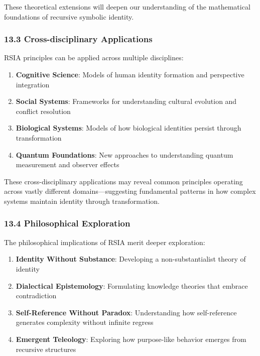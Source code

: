 \documentclass[12pt]{article}
\providecommand{\tightlist}{%
  \setlength{\itemsep}{0pt}\setlength{\parskip}{0pt}}
\begin{document}
These theoretical extensions will deepen our understanding of the
mathematical foundations of recursive symbolic identity.

\subsubsection{13.3 Cross-disciplinary
Applications}\label{cross-disciplinary-applications}

RSIA principles can be applied across multiple disciplines:

\begin{enumerate}
\def\labelenumi{\arabic{enumi}.}
\tightlist
\item
  \textbf{Cognitive Science}: Models of human identity formation and
  perspective integration
\item
  \textbf{Social Systems}: Frameworks for understanding cultural
  evolution and conflict resolution
\item
  \textbf{Biological Systems}: Models of how biological identities
  persist through transformation
\item
  \textbf{Quantum Foundations}: New approaches to understanding quantum
  measurement and observer effects
\end{enumerate}

These cross-disciplinary applications may reveal common principles
operating across vastly different domains---suggesting fundamental
patterns in how complex systems maintain identity through
transformation.

\subsubsection{13.4 Philosophical
Exploration}\label{philosophical-exploration}

The philosophical implications of RSIA merit deeper exploration:

\begin{enumerate}
\def\labelenumi{\arabic{enumi}.}
\tightlist
\item
  \textbf{Identity Without Substance}: Developing a non-substantialist
  theory of identity
\item
  \textbf{Dialectical Epistemology}: Formulating knowledge theories that
  embrace contradiction
\item
  \textbf{Self-Reference Without Paradox}: Understanding how
  self-reference generates complexity without infinite regress
\item
  \textbf{Emergent Teleology}: Exploring how purpose-like behavior
  emerges from recursive structures
\end{enumerate}
\end{document}
